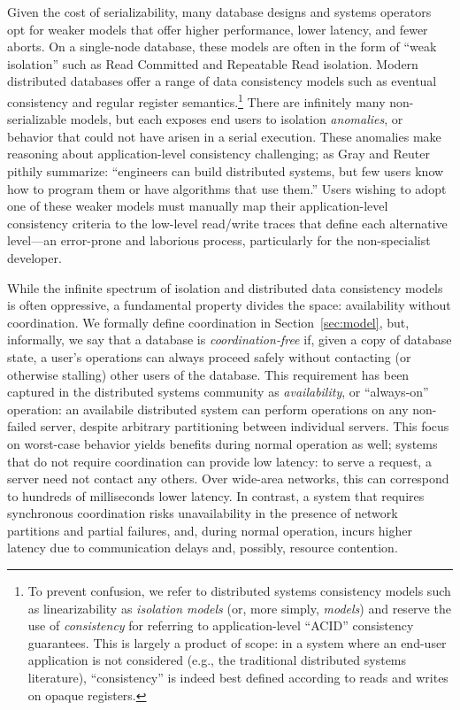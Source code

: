 
Given the cost of serializability, many database designs and systems
operators opt for weaker models that offer higher performance, lower
latency, and fewer aborts. On a single-node database, these models are
often in the form of ``weak isolation'' such as Read Committed and
Repeatable Read isolation. Modern distributed databases offer a range
of data consistency models such as eventual consistency and regular
register semantics.\footnote{To prevent confusion, we refer to
  distributed systems consistency models such as linearizability as
  \textit{isolation models} (or, more simply, \textit{models}) and
  reserve the use of \textit{consistency} for referring to
  application-level ``ACID'' consistency guarantees. This is largely a
  product of scope: in a system where an end-user application is not
  considered (e.g., the traditional distributed systems literature),
  ``consistency'' is indeed best defined according to reads and writes
  on opaque registers.}  There are infinitely many non-serializable
models, but each exposes end users to isolation \textit{anomalies}, or
behavior that could not have arisen in a serial execution. These
anomalies make reasoning about application-level consistency
challenging; as Gray and Reuter pithily summarize: ``engineers can
build distributed systems, but few users know how to program them or
have algorithms that use them.''  Users wishing to adopt one of these
weaker models must manually map their application-level consistency
criteria to the low-level read/write traces that define each
alternative level---an error-prone and laborious process, particularly
for the non-specialist developer.


 While the infinite spectrum
of isolation and distributed data consistency models is often
oppressive, a fundamental property divides the space: availability
without coordination. We formally define coordination in
Section~\ref{sec:model}, but, informally, we say that a database is
\textit{coordination-free} if, given a copy of database state, a
user's operations can always proceed safely without contacting (or
otherwise stalling) other users of the database. This requirement has
been captured in the distributed systems community as
\textit{availability}, or ``always-on'' operation: an availabile
distributed system can perform operations on any non-failed server,
despite arbitrary partitioning between individual servers. This focus
on worst-case behavior yields benefits during normal operation as
well; systems that do not require coordination can provide low
latency: to serve a request, a server need not contact any
others. Over wide-area networks, this can correspond to hundreds of
milliseconds lower latency. In contrast, a system that requires
synchronous coordination risks unavailability in the presence of
network partitions and partial failures, and, during normal operation,
incurs higher latency due to communication delays and, possibly,
resource contention.

